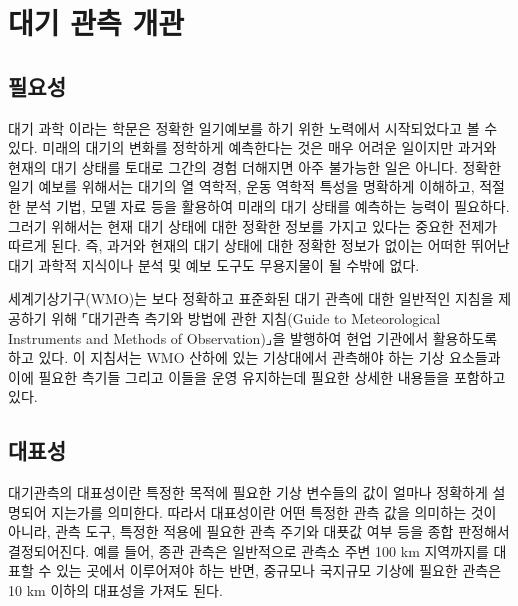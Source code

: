 



\section{대기 관측 개관}

\subsection{필요성}

대기 과학 이라는 학문은 정확한 일기예보를 하기 위한 노력에서 시작되었다고 볼 수 있다. 미래의 대기의 변화를 정학하게 예측한다는 것은 매우 어려운 일이지만 과거와 현재의 대기 상태를 토대로 그간의 경험 더해지면 아주 불가능한 일은 아니다. 정확한 일기 예보를 위해서는 대기의 열 역학적, 운동 역학적 특성을 명확하게 이해하고, 적절한 분석 기법, 모델 자료 등을 활용하여 미래의 대기 상태를 예측하는 능력이 필요하다. 그러기 위해서는 현재 대기 상태에 대한 정확한 정보를 가지고 있다는 중요한 전제가 따르게 된다. 즉, 과거와 현재의 대기 상태에 대한 정확한 정보가 없이는 어떠한 뛰어난 대기 과학적 지식이나 분석 및 예보 도구도 무용지물이 될 수밖에 없다.

세계기상기구(WMO)는 보다 정확하고 표준화된 대기 관측에 대한 일반적인 지침을 제공하기 위해 ⌜대기관측 측기와 방법에 관한 지침(Guide to Meteorological Instruments and Methods of Observation)⌟을 발행하여 현업 기관에서 활용하도록 하고 있다. 이 지침서는 WMO 산하에 있는 기상대에서 관측해야 하는 기상 요소들과 이에 필요한 측기들 그리고 이들을 운영 유지하는데 필요한 상세한 내용들을 포함하고 있다. 

\subsection{대표성}

대기관측의 대표성이란 특정한 목적에 필요한 기상 변수들의 값이 얼마나 정확하게 설명되어 지는가를 의미한다. 따라서 대표성이란 어떤 특정한 관측 값을 의미하는 것이 아니라, 관측 도구, 특정한 적용에 필요한 관측 주기와 대푯값 여부 등을 종합 판정해서 결정되어진다. 예를 들어, 종관 관측은 일반적으로 관측소 주변 100 km 지역까지를 대표할 수 있는 곳에서 이루어져야 하는 반면, 중규모나 국지규모 기상에 필요한 관측은 10 km 이하의 대표성을 가져도 된다.

